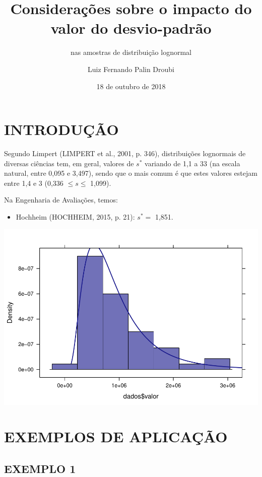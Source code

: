 \documentclass[]{article}
\title{Considerações sobre o impacto do valor do desvio-padrão}
\subtitle{nas amostras de distribuição lognormal}
\author{Luiz Fernando Palin Droubi}
\date{18 de outubro de 2018}
\providecommand{\tightlist}{%
  \setlength{\itemsep}{0pt}\setlength{\parskip}{0pt}}
\begin{document}
\maketitle

\section{INTRODUÇÃO}\label{introducao}

Segundo Limpert (LIMPERT et al., 2001, p. 346), distribuições lognormais
de diversas ciências tem, em geral, valores de \(s^*\) variando de 1,1 a
33 (na escala natural, entre 0,095 e 3,497), sendo que o mais comum é
que estes valores estejam entre 1,4 e 3 (0,336 \(\leq s \leq\) 1,099).

Na Engenharia de Avaliações, temos:

\begin{itemize}
\tightlist
\item
  Hochheim (HOCHHEIM, 2015, p. 21): \(s^* =\) 1,851.
\end{itemize}

\includegraphics{Impacto_sigma_files/figure-latex/unnamed-chunk-2-1.pdf}

\section{EXEMPLOS DE APLICAÇÃO}\label{exemplos-de-aplicacao}

\subsection{EXEMPLO 1}\label{exemplo-1}
\end{document}
